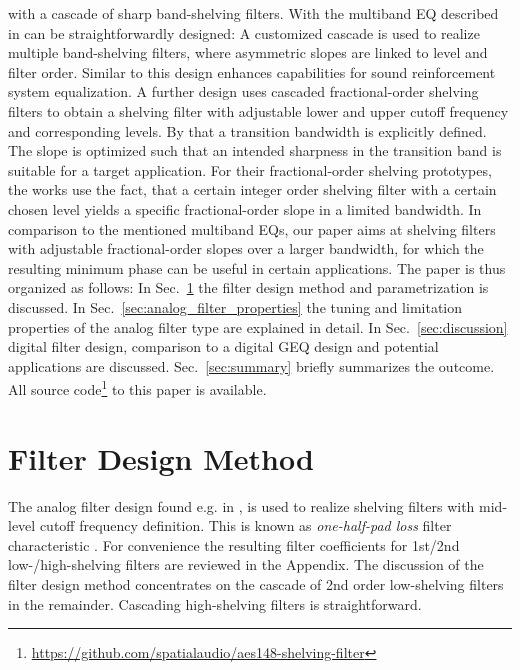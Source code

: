 with a cascade of sharp band-shelving filters.
%
With \cite{Holters2006a, Holters2006b} the multiband EQ
described in \cite{Lorente2017} can be straightforwardly designed:
%
A customized cascade is used
to realize multiple band-shelving filters, where asymmetric slopes are linked
to level and filter order.
%
Similar to \cite{McGrath2004} this design enhances capabilities for
sound reinforcement system equalization.
%
A further design \cite{Eastty2008, Eastty2015} uses
cascaded fractional-order shelving filters to obtain a shelving filter
with adjustable lower and upper cutoff frequency and corresponding levels.
%
By that a transition bandwidth is explicitly defined.
%
The slope is optimized such that an intended sharpness in the transition band
is suitable for a target application.
%
For their fractional-order shelving prototypes, the works \cite{Eastty2008, Eastty2015}
use the fact, that
a certain integer order shelving filter with a certain chosen level
yields a specific fractional-order slope in a limited bandwidth.
%
%
%
\NewL In comparison to the mentioned multiband EQs, our paper aims at shelving
filters with adjustable fractional-order slopes over a larger bandwidth,
for which the resulting minimum phase can be useful in certain applications.
%
The paper is thus organized as follows:
%
In Sec.~\ref{sec:filter_design} the filter design method and parametrization
is discussed.
%
In Sec.~\ref{sec:analog_filter_properties} the tuning and limitation properties
of the analog filter type are explained in detail.
%
In Sec.~\ref{sec:discussion} digital filter design, comparison to a digital GEQ design
and potential applications are
discussed.
%
Sec.~\ref{sec:summary} briefly summarizes the outcome.
%
All source
code\footnote{\url{https://github.com/spatialaudio/aes148-shelving-filter}}
to this paper is available.

\section{Filter Design Method}
\label{sec:filter_design}
The analog filter design found e.g. in \cite[Sec. 3.2]{Valimaki2016},
\cite{Spors2019} is used to realize shelving filters with mid-level cutoff
frequency definition.
%
This is known as \textit{one-half-pad loss} filter characteristic
\cite{Kimball1938}. %
%
For convenience the resulting filter coefficients for 1st/2nd low-/high-shelving
filters are reviewed in the Appendix.
%
The discussion of the filter design method concentrates on the cascade of
2nd order low-shelving filters in the remainder.
%
Cascading high-shelving filters is straightforward.
%

